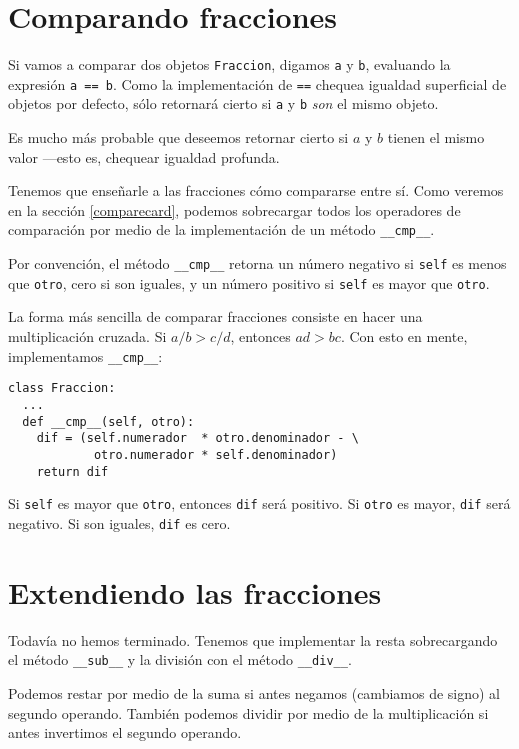 \section{Comparando fracciones}

 

Si vamos a comparar dos objetos \texttt{Fraccion}, digamos \texttt{a}
y \texttt{b}, evaluando la expresión \texttt{a == b}. Como la implementación
de \texttt{==} chequea igualdad superficial de objetos por defecto,
sólo retornará cierto si \texttt{a} y \texttt{b} \textit{son} el mismo
objeto.

Es mucho más probable que deseemos retornar cierto si $a$ y $b$
tienen el mismo valor —esto es, chequear igualdad profunda.

Tenemos que enseñarle a las fracciones cómo compararse entre sí. Como
veremos en la sección \ref{comparecard}, podemos sobrecargar todos
los operadores de comparación por medio de la implementación de un
método \texttt{\_\_cmp\_\_}.

Por convención, el método \texttt{\_\_cmp\_\_} retorna un número negativo
si \texttt{self} es menos que \texttt{otro}, cero si son iguales,
y un número positivo si \texttt{self} es mayor que \texttt{otro}.

La forma más sencilla de comparar fracciones consiste en hacer una
multiplicación cruzada. Si $a/b>c/d$, entonces $ad>bc$. Con esto
en mente, implementamos \texttt{\_\_cmp\_\_}:

\begin{lstlisting}
class Fraccion:
  ...
  def __cmp__(self, otro):
    dif = (self.numerador  * otro.denominador - \
            otro.numerador * self.denominador)
    return dif
\end{lstlisting}
 Si \texttt{self} es mayor que \texttt{otro}, entonces \texttt{dif}
será positivo. Si \texttt{otro} es mayor, \texttt{dif} será negativo.
Si son iguales, \texttt{dif} es cero.

\section{Extendiendo las fracciones}

Todavía no hemos terminado. Tenemos que implementar la resta sobrecargando
el método \texttt{\_\_sub\_\_} y la división con el método \texttt{\_\_div\_\_}.

Podemos restar por medio de la suma si antes negamos (cambiamos de
signo) al segundo operando. También podemos dividir por medio de la
multiplicación si antes invertimos el segundo operando.

